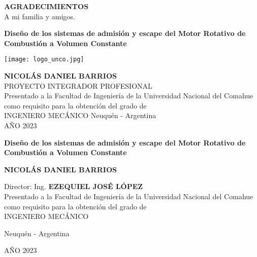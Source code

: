 \newpage
\thispagestyle{plain}

\begin{center}

\textbf{AGRADECIMIENTOS}\\
\vspace{1cm}
A mi familia y amigos.

\end{center}


\begin{center}
\Large\textbf{{Diseño de los sistemas de admisión y escape del Motor Rotativo
    de Combustión a Volumen Constante\\}}

\vspace{2cm}

\texttt{[image: logo\_unco.jpg]}\\

\vspace{1cm}

\Large{\textbf{ NICOLÁS DANIEL BARRIOS\\ }}
\vspace{1cm}
PROYECTO INTEGRADOR PROFESIONAL\\
\vspace{1cm}
Presentado a la Facultad de Ingeniería de la Universidad Nacional del Comahue
como requisito para la obtención del grado de \\ INGENIERO MECÁNICO
\vspace{1cm}
Neuquén - Argentina\\
AÑO 2023
\vspace{1cm}
\end{center}

\pagebreak

\begin{center}

\Large\textbf{{Diseño de los sistemas de admisión y escape del Motor Rotativo
de Combustión a Volumen Constante\\}}

\vspace{4cm}

\large{\textbf{
NICOLÁS DANIEL BARRIOS\\
}}

\vspace{3cm}
Director: Ing.  \textbf{EZEQUIEL JOSÉ LÓPEZ}\\

\vspace{3cm}
%
Presentado a la Facultad de Ingeniería de la Universidad Nacional del Comahue
como requisito para la obtención del grado de \\ INGENIERO MECÁNICO

\vfill
Neuquén - Argentina

AÑO 2023
\end{center}

